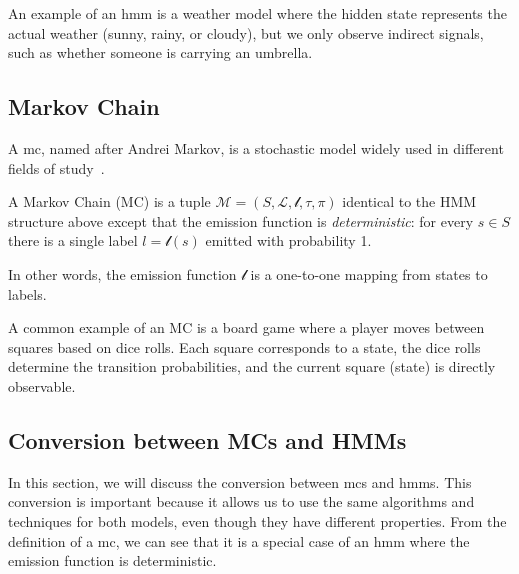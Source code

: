 An example of an \gls{hmm} is a weather model where the hidden state represents the actual weather (sunny, rainy, or cloudy), but we only observe indirect signals, such as whether someone is carrying an umbrella.

\subsection{Markov Chain}\label{subsec:mc}
A \gls{mc}, named after Andrei Markov, is a stochastic model widely used in different fields of study~\cite{Rabiner89}.
\begin{definition}
    A Markov Chain (MC) is a tuple $\mathcal{M} = (S, \mathcal{L}, \mathscr{l}, \tau,  \pi)$ identical to the HMM structure above except that the emission function is
    \emph{deterministic}: for every $s\in S$ there is a single label
    $l=\mathscr{l}(s)$ emitted with probability 1.
\end{definition}
In other words, the emission function $\mathscr{l}$ is a one-to-one mapping from states to labels.

A common example of an MC is a board game where a player moves between squares based on dice rolls.
Each square corresponds to a state, the dice rolls determine the transition probabilities, and the current square (state) is directly observable.

\subsection{Conversion between MCs and HMMs}\label{subsec:mc_hmm_conversion}
In this section, we will discuss the conversion between \glspl{mc} and \glspl{hmm}.
This conversion is important because it allows us to use the same algorithms and techniques for both models, even though they have different properties.
From the definition of a \gls{mc}, we can see that it is a special case of an \gls{hmm} where the emission function is deterministic.

